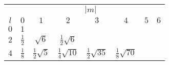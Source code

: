 \begin{table}[h] \renewcommand{\arraystretch}{1.3}
  \begin{center}
    \begin{tabular}{c|ccccccc}
          & \multicolumn{7}{|c}{$|m|$} \\  \cline{2-8}
      $l$ & $0$ & $1$ & $2$ & $3$ & $4$ & $5$ & $6$ \\
      \hline \hline
      $0$ & $1$               &                               &                                  & & & & \\
      $2$ & $\frac{1}{2}$  & $\sqrt{6}$             & $\frac{1}{2}\sqrt{6}$  & & & & \\
      $4$ & $\frac{1}{8}$  & $\frac{1}{2}\sqrt{5}$  & $\frac{1}{4}\sqrt{10}$   & $\frac{1}{2}\sqrt{35}$ & $\frac{1}{8}\sqrt{70}$   & & \\

\end{tabular}
\end{center}
\end{table}
